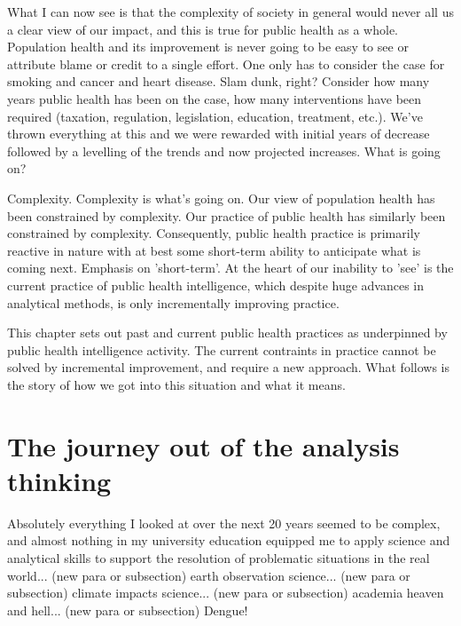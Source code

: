 What I can now see is that the complexity of society in general would never all us a clear view of our impact, and this is true for public health as a whole. Population health and its improvement is never going to be easy to see or attribute blame or credit to a single effort. One only has to consider the case for smoking and cancer and heart disease. Slam dunk, right? Consider how many years public health has been on the case, how many interventions have been required (taxation, regulation, legislation, education, treatment, etc.). We've thrown everything at this and we were rewarded with initial years of decrease followed by a levelling of the trends and now projected increases. What is going on?

Complexity. Complexity is what's going on. Our view of population health has been constrained by complexity. Our practice of public health has similarly been constrained by complexity. Consequently, public health practice is primarily reactive in nature with at best some short-term ability to anticipate what is coming next. Emphasis on 'short-term'. At the heart of our inability to 'see' is the current practice of public health intelligence, which despite huge advances in analytical methods, is only incrementally improving practice.

This chapter sets out past and current public health practices as underpinned by public health intelligence activity. The current contraints in practice cannot be solved by incremental improvement, and require a new approach. What follows is the story of how we got into this situation and what it means.


\section{The journey out of the analysis thinking}

Absolutely everything I looked at over the next 20 years seemed to be complex, and almost nothing in my university education equipped me to apply science and analytical skills to support the resolution of problematic situations in the real world... (new para or subsection) earth observation science... (new para or subsection) climate impacts science... (new para or subsection) academia heaven and hell... (new para or subsection) Dengue!
